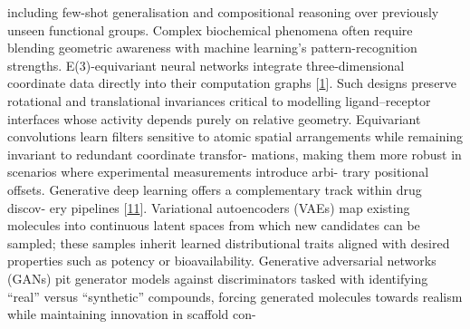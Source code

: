 \documentclass[
]{article}
\begin{document}
including few-shot generalisation and compositional reasoning over
previously unseen functional groups. Complex biochemical phenomena often
require blending geometric awareness with machine learning's
pattern-recognition strengths. E(3)-equivariant neural networks
integrate three-dimensional coordinate data directly into their
computation graphs {[}\hyperref[_bookmark41]{1}{]}. Such designs
preserve rotational and translational invariances critical to modelling
ligand--receptor interfaces whose activity depends purely on relative
geometry. Equivariant convolutions learn filters sensitive to atomic
spatial arrangements while remaining invariant to redundant coordinate
transfor- mations, making them more robust in scenarios where
experimental measurements introduce arbi- trary positional offsets.
Generative deep learning offers a complementary track within drug
discov- ery pipelines {[}\hyperref[_bookmark51]{11}{]}. Variational
autoencoders (VAEs) map existing molecules into continuous latent spaces
from which new candidates can be sampled; these samples inherit learned
distributional traits aligned with desired properties such as potency or
bioavailability. Generative adversarial networks (GANs) pit generator
models against discriminators tasked with identifying ``real'' versus
``synthetic'' compounds, forcing generated molecules towards realism
while maintaining innovation in scaffold con-
\end{document}
